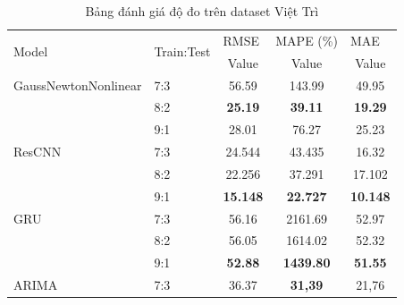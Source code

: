\documentclass[conference]{IEEEtran}
\begin{document}
\begin{table}[ht]
    \centering
    \caption{Bảng đánh giá độ đo trên dataset Việt Trì}
    \begin{tabular}{|l|l|c|c|c|}
        \hline
        \multirow{2}{*}{Model} & \multirow{2}{*}{Train:Test} & \multicolumn{1}{l|}{RMSE} & \multicolumn{1}{l|}{MAPE (\%)} & \multicolumn{1}{l|}{MAE} \\ \cline{3-5}
                               &                             & Value                     & Value                          & Value                    \\ \hline
        GaussNewtonNonlinear   & 7:3                         & 56.59                     & 143.99                         & 49.95                    \\ \cline{2-5}
                               & 8:2                         & \textbf{25.19}            & \textbf{39.11}                 & \textbf{19.29}           \\ \cline{2-5}
                               & 9:1                         & 28.01                     & 76.27                          & 25.23                    \\ \hline
        ResCNN                 & 7:3                         & 24.544                    & 43.435                         & 16.32                    \\ \cline{2-5}
                               & 8:2                         & 22.256                    & 37.291                         & 17.102                   \\ \cline{2-5}
                               & 9:1                         & \textbf{15.148}           & \textbf{22.727}                & \textbf{10.148}          \\ \hline
        GRU                    & 7:3                         & 56.16                     & 2161.69                        & 52.97                    \\ \cline{2-5}
                               & 8:2                         & 56.05                     & 1614.02                        & 52.32                    \\ \cline{2-5}
                               & 9:1                         & \textbf{52.88}            & \textbf{1439.80}               & \textbf{51.55}           \\ \hline
        ARIMA                  & 7:3                         & 36.37                     & \textbf{31,39}                 & 21,76                    \\ \cline{2-5}

\end{tabular}
\end{table}
\end{document}
